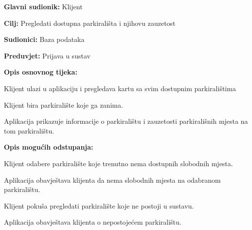 \noindent {}
\begin{packed_item}
	
	\item \textbf{Glavni sudionik: }Klijent
	\item  \textbf{Cilj:} Pregledati dostupna parkirališta i njihovu zauzetost
	\item  \textbf{Sudionici:} Baza podataka
	\item  \textbf{Preduvjet:} Prijava u sustav
	\item  \textbf{Opis osnovnog tijeka:}
	
	\item[] \begin{packed_enum}
		
		\item Klijent ulazi u aplikaciju i pregledava kartu sa svim dostupnim parkiralištima
		\item Klijent bira parkiralište koje ga zanima.
		\item Aplikacija prikazuje informacije o parkiralištu i zauzetosti parkirališnih mjesta na tom parkiralištu.
		
	\end{packed_enum}
	
	\item  \textbf{Opis mogućih odstupanja:}
	
	\item[] \begin{packed_item}
		
		\item[2.a] Klijent odabere parkiralište koje trenutno nema dostupnih slobodnih mjesta.
		\item[] \begin{packed_enum}
			
			\item Aplikacija obavještava klijenta da nema slobodnih mjesta na odabranom parkiralištu.
			
		\end{packed_enum}
		\item[2.b] Klijent pokuša pregledati parkiralište koje ne postoji u sustavu.
		\item[] \begin{packed_enum}
			
			\item Aplikacija obavještava klijenta o nepostojećem parkiralištu.
			
		\end{packed_enum}
		
	\end{packed_item}
	
\end{packed_item}

